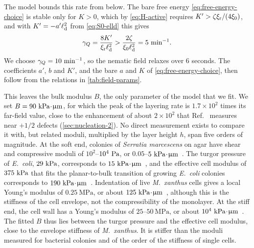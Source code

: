 \documentclass[aps,pre,reprint,superscriptaddress,longbibliography,nofootinbib
]{revtex4-2}
\begin{document}
The model bounds this rate from below. The bare free energy
\cref{eq:free-energy-choice} is stable only for $K>0$,
which by \cref{eq:H-active} requires
$K'>\zeta\xir/(4\xi_0)$, and with $K'=-a'\elld^2$ from
\cref{eq:S0-elld} this gives
\begin{equation}
  \label{eq:gamma-bound}
  \gamma_Q=\frac{8K'}{\xir\elld^2}>\frac{2\zeta}{\xi_0\elld^2}=5~\minute^{-1}.
\end{equation}
We choose $\gamma_Q=10~\minute^{-1}$, so the nematic field
relaxes over $6$ seconds. The coefficients $a'$, $b$ and
$K'$, and the bare $a$ and $K$ of
\cref{eq:free-energy-choice}, then follow from the
relations in \cref{tab:field-params}.

This leaves the bulk modulus $B$, the only parameter of the
model that we fit. We set $B=90~\kPa\tcdot\micron$, for
which the peak of the layering rate is $1.7\times10^2$
times its far-field value, close to the enhancement of
about $2\times10^2$ that Ref.~\cite{copenhagen2021}
measures near $+1/2$ defects (\cref{sec:nucleation-2}). No
direct measurement exists to compare it with, but related
moduli, multiplied by the layer height $h$, span five
orders of magnitude. At the soft end, colonies of
\textit{Serratia marcescens} on agar have shear and
compressive moduli of $10^2$--$10^4~\Pa$, or
$0.05$--$5~\kPa\tcdot\micron$~\cite{kochanowski2024}. The
turgor pressure of \textit{E.\ coli}, $29~\kPa$,
corresponds to
$15~\kPa\tcdot\micron$~\cite{deng2011direct}, and the
effective cell modulus of $375~\kPa$ that fits the
planar-to-bulk transition of growing \textit{E.\ coli}
colonies corresponds to
$190~\kPa\tcdot\micron$~\cite{grant2014}. Indentation of
live \textit{M.\ xanthus} cells gives a local Young's
modulus of $0.25~\mathrm{MPa}$, or about
$125~\kPa\tcdot\micron$~\cite{pelling2005nanoscale},
although this is the stiffness of the cell envelope, not
the compressibility of the monolayer. At the stiff end, the
cell wall has a Young's modulus of $25$--$50~\mathrm{MPa}$,
or about
$10^4~\kPa\tcdot\micron$~\cite{yao1999thickness,
deng2011direct}. The fitted $B$ thus lies between the
turgor pressure and the effective cell modulus, close to
the envelope stiffness of \textit{M.\ xanthus}. It is
stiffer than the moduli measured for bacterial colonies and
of the order of the stiffness of single cells.
\end{document}
